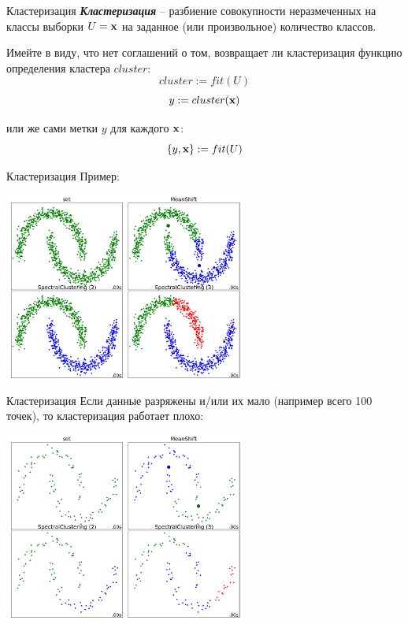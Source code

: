 \documentclass{beamer}
\newcommand{\termdef}[1]{\textbf{\textit{#1}}}
\begin{document}
   \begin{frame}{Кластеризация}
   \termdef{Кластеризация} -- разбиение совокупности неразмеченных на классы выборки $U = {\bold x}$ на заданное (или произвольное) количество классов. 
   
   Имейте в виду, что нет соглашений о том, возвращает ли кластеризация функцию определения кластера $cluster$:
  \begin{equation}
  cluster := fit(U) 
  \end{equation}
  \begin{equation}
  y := cluster(\bold x) 
  \end{equation}
   
   или же сами метки $y$ для каждого $\bold x$:
   \begin{equation}
   \{ y, \bold x \} := fit(U) 
   \end{equation}
   \end{frame}

	\begin{frame}{Кластеризация}
	Пример:
	\begin{center}
	\includegraphics[width=8cm]{../pic/clustering_example_1.png}
	\end{center}
	\end{frame}
   
   \begin{frame}{Кластеризация}
   Если данные разряжены и/или их мало (например всего 100 точек), то кластеризация работает плохо:
   \begin{center}
   	\includegraphics[width=8cm]{../pic/clustering_example_2.png}
   \end{center}
	\end{frame}
\end{document}
